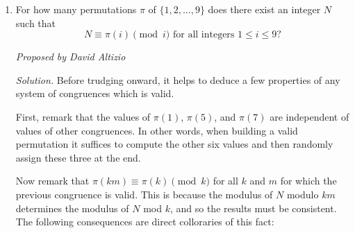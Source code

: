 \documentclass[10pt]{article}
\newcommand{\proposed}[1]
{
\vspace{5pt}
\noindent\textit{Proposed by #1}
}
\newcommand{\solution}
{
\vspace{5pt}
\noindent\textit{Solution.}\qquad
}
\begin{document}
\begin{enumerate}
\solution I claim that $P$ has integer roots if and only if $a+c = 2b$.
	Indeed, if $a+c = 2b$ then $x=-1$ is obviously a root, while Vieta's
	relations guarantee that the other root of $P$ will also be an integer.
	Now, suppose $r_{1}, r_{2}$ are the two integer roots of $P$. Then,
	$r_{1} r_{2} = 4ab + 4bc - 2ca$, $r_{1} + r_{2} = -(a^{2} + 4b^{2} +
	c^{2} + 1)$. Note that the product is positive and the sum is negative,
	and therefore $r_{1}, r_{2} \leq -1$. Then,
	\begin{align*}
		(r_{1} + 1)(r_{2}+1) &= r_{1}r_{2} + r_{1} + r_{2} + 1\\
		&= 4ab + 4bc - 2ca -a^{2} - 4b^{2} - c^{2}.
	\end{align*}
	The last expression factors as $-(a-2b+c)^{2} \leq 0$, with equality if
	and only if $a +c = 2b$. On the other
	hand, $r_{1} +1, r_{2} +1 \leq 0$, and so $(r_{1}+1)(r_{2}+1) \geq 0$.
	Therefore, equality must hold, and $r_{1},r_{2}$ integer roots $\implies
	a+c = 2b$. \\
	Now, we count the number of such solutions $a \leq b \leq c \leq 100$
	satisfying $a+c = 2b$. Note that if $a,c$ are of the same parity, then
	$b$ is uniquely determined, and otherwise no such $b$ exists. For $a,c$
	even there are $\dbinom{50}{2} + 50 = 25 \cdot 51$ possibilities, with
	$\dbinom{50}{2}$ counting solutions with $a \neq c$ and the additional
	$50$ counting solutions with $a = c$. For $a,c$ odd the number of
	solutions is identical. In total there are $50 \cdot 51 \equiv 50 \cdot
	11 \equiv \boxed{550} \pmod{1000}$ solutions.

\item For how many permutations $\pi$ of $\{1,2,\ldots,9\}$ does there exist an integer $N$ such that \[N\equiv \pi(i)\pmod{i}\text{ for all integers }1\leq i\leq 9?\] %

\proposed{David Altizio}

\solution Before trudging onward, it helps to deduce a few properties of any system of congruences which is valid.

\par First, remark that the values of $\pi(1)$, $\pi(5)$, and $\pi(7)$ are independent of values of other congruences.  In other words, when building a valid permutation it suffices to compute the other six values and then randomly assign these three at the end.

\par Now remark that $\pi(km)\equiv\pi(k)\pmod k$ for all $k$ and $m$ for which the previous congruence is valid.  This is because the modulus of $N$ modulo $km$ determines the modulus of $N$ mod $k$, and so the results must be consistent.  The following consequences are direct colloraries of this fact:


\end{enumerate}
\end{document}
